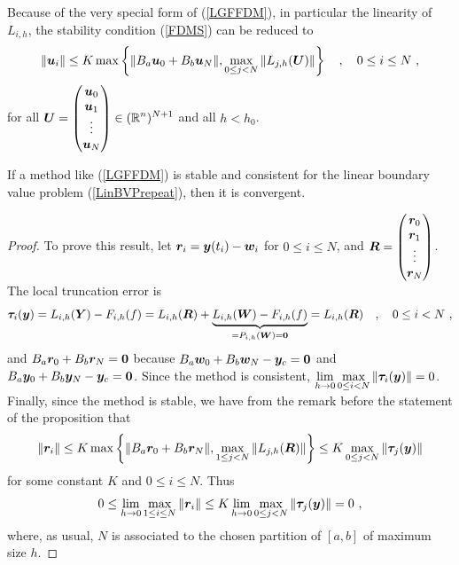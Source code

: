 Because of the very special form of (\ref{LGFFDM}), in particular the
linearity of $L_{i,h}$, the stability condition
(\ref{FDMS}) can be reduced to
\begin{equation} \label{lin_form_FDMS}
\| \bm{u}_i \| \leq K
\max \left\{ \| B_a\bm{u}_0 + B_b\bm{u}_N \| ,
\max_{0\leq j < N} \| L_{j,h}(\bm{U}) \|
\right\} \quad , \quad 0 \leq i \leq N \ ,
\end{equation}
for all
$\displaystyle \bm{U} = \begin{pmatrix} 
\bm{u}_0 \\ \bm{u}_1 \\ \vdots \\ \bm{u}_N \end{pmatrix}
\in (\mathbb{R}^n)^{N+1}$ and all $h < h_0$.

\begin{prop}
If a method like (\ref{LGFFDM}) is stable and consistent for the
linear boundary value problem (\ref{LinBVPrepeat}), then it is
convergent.
\label{FEMST_C}
\end{prop}

\begin{proof}
To prove this result, 
let $\bm{r}_i = \bm{y}(t_i) - \bm{w}_i$ for $0\leq i \leq N$, and
$\displaystyle \bm{R} = \begin{pmatrix}
\bm{r}_0 \\ \bm{r}_1 \\ \vdots \\ \bm{r}_N \end{pmatrix}$.
The local truncation error is
\[
\bm{\tau}_i(\bm{y}) =
L_{i,h}(\bm{Y}) - F_{i,h}(f)
= L_{i,h}(\bm{R}) + \underbrace{L_{i,h}(\bm{W})
- F_{i,h}(f)}_{=P_{i,h}(\bm{W}) = \bm{0}}
= L_{i,h}(\bm{R}) \quad , \quad 0 \leq i < N \ ,
\]
and $B_a\bm{r}_0 + B_b\bm{r}_N = \bm{0}$ because
$B_a\bm{w}_0 + B_b\bm{w}_N -\bm{y}_c = \bm{0}$ and
$B_a\bm{y}_0 + B_b\bm{y}_N - \bm{y}_c = \bm{0}$.
Since the method is consistent,
$\displaystyle \lim_{h\to 0} \max_{0\leq i < N}\|\bm{\tau}_i(\bm{y}) \|= 0$.
Finally, since the method is stable, we have from the remark before
the statement of the proposition that
\[
\| \bm{r}_i \| \leq
K \max \left\{ \| B_a\bm{r}_0 +B_b\bm{r}_N \| ,
\max_{1\leq j < N} \| L_{j,h}(\bm{R}) \|
\right\}
\leq K \max_{0\leq j < N} \| \bm{\tau}_j(\bm{y}) \|
\]
for some constant $K$ and $0 \leq i \leq N$.
Thus
\[
0 \leq \lim_{h\to 0}  \max_{1\leq i \leq N} \| \bm{r}_i \| 
\leq K \lim_{h\to 0} \max_{0\leq j < N} \| \bm{\tau}_j(\bm{y}) \| = 0 \ ,
\]
where, as usual, $N$ is associated to the chosen partition of
$[a,b]$ of maximum size $h$.
\end{proof}

